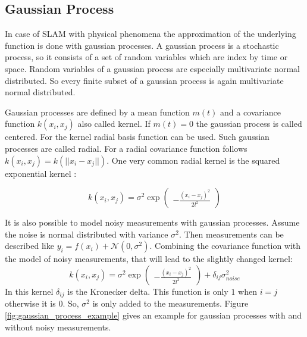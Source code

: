 \subsection{Gaussian Process}
\label{chap:gaussian}
In case of SLAM with physical phenomena the approximation of the underlying function is done 
with gaussian processes. A gaussian process is a stochastic process, so it consists of a set of random
variables which are index by time or space. Random variables of a gaussian process are especially multivariate
normal distributed. So every finite subset of a gaussian process is again multivariate normal distributed.

Gaussian processes are defined by a mean function $m(t)$ and a covariance function $k(x_i, x_j)$ also called kernel.
If $m(t) = 0$ the gaussian process is called centered. For the kernel radial basis function can be used. Such
gaussian processes are called radial. For a radial covariance function follows $k(x_i, x_j) = k(||x_i - x_j||)$. 
One very common radial kernel is the squared exponential kernel \cite{ebden_gaussian_2015}:

$$
k(x_i, x_j) = \sigma ^2 \exp 
\begin{pmatrix}
	-\frac{(x_i - x_j)^2}{2l^2}
\end{pmatrix}
$$

It is also possible to model noisy measurements with gaussian processes. Assume the noise is normal distributed
with variance $\sigma^2$. Then measurements can be described like $y_i = f(x_i) + \mathcal{N}(0, \sigma^2)$.
Combining the covariance function with the model of noisy measurements, that will lead to the slightly 
changed kernel:
$$
k(x_i, x_j) = \sigma ^2 \exp 
\begin{pmatrix}
	-\frac{(x_i - x_j)^2}{2l^2}
\end{pmatrix}
+ \delta_{ij} \sigma^2_{noise}
$$
In this kernel $\delta_{ij}$ is the Kronecker delta. This function is only $1$ when $i=j$ otherwise it is $0$. 
So, $\sigma^2$ is only added to the measurements. Figure \ref{fig:gaussian_process_example} gives an example 
for gaussian processes with and without noisy measurements.


